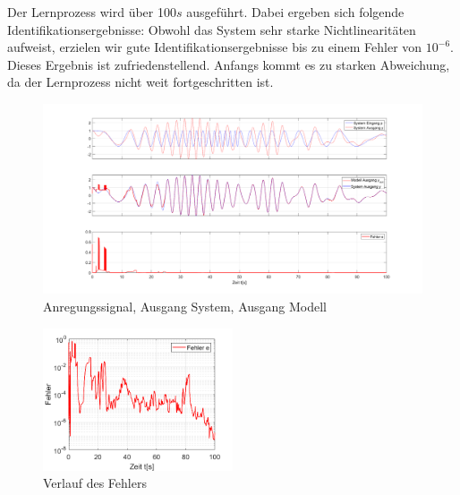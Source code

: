 \documentclass[paper=a4, fontsize=11pt]{scrartcl} %
\numberwithin{equation}{section} %
\numberwithin{figure}{section} %
\numberwithin{table}{section} %
\begin{document}
Der Lernprozess wird über 100$s$ ausgeführt. Dabei ergeben sich folgende Identifikationsergebnisse:
Obwohl das System sehr starke Nichtlinearitäten aufweist, erzielen wir gute Identifikationsergebnisse bis zu einem Fehler von $10^{-6}$. Dieses Ergebnis ist zufriedenstellend. Anfangs kommt es zu starken Abweichung, da der Lernprozess nicht weit fortgeschritten ist.
\begin{figure}[!h]
	\centering
		\includegraphics[width=1.00\textwidth]{./Q_500_nice_results_double_chirp.png}
	\caption{Anregungssignal, Ausgang System, Ausgang Modell}
	\label{fig:Nice_result_double_chirp}
\end{figure}

\begin{figure}[!h]
	\centering
		\includegraphics[width=0.5\textwidth]{./Q_500_nice_results_double_chirp_2.png}
	\caption{Verlauf des Fehlers}
	\label{fig:Nice_result_double_chirp2}
\end{figure}
\newpage
\end{document}
